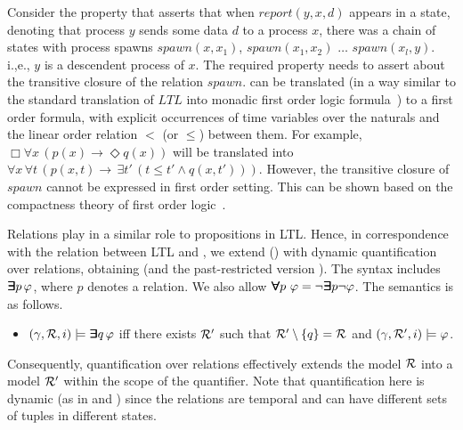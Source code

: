 \vspace{1ex}
Consider the property that asserts that when
$\mathit{report}(y , x, d)$ appears
in a state, denoting that  process 
$y$ sends some data $d$ to a process $x$,
there was a chain of states with process spawns
$\mathit{spawn}(x, x_1)$, $\mathit{spawn} (x_1, x_2)$ $\ldots$
$\mathit{spawn}(x_l , y)$. i.,e., $y$ is a descendent process of $x$.
The required property needs to
assert about the transitive closure
of the relation $\mathit{spawn}$. 
\FLTL{} can be translated (in a way similar to the standard translation of $LTL$ into monadic first order logic formula~\cite{Thomas}) to a first order formula, with explicit occurrences of time variables
over the naturals and the linear
order relation $<$ (or $\leq$) between them.
For example, $\Box \forall x \, (p(x) \rightarrow \Diamond q(x))$ will be translated into $\forall x \, \forall t \, (p(x, t) \rightarrow  \, \exists t' \, (t \leq t' \wedge q(x, t') ) )$.
However, the transitive closure of $\mathit{spawn}$ cannot be expressed in first order setting. This can be
shown based on the
compactness theory of first order logic~\cite{Flum}.

\vspace{1.5ex}
 Relations play in \FLTL{} a
similar role to propositions in LTL.
Hence, in correspondence with the relation
between LTL and \QLTL{}, we
extend \FLTL{} (\PFLTL{}) with dynamic quantification over relations, obtaining \QFLTL{}
(and the past-restricted version \QPFLTL{}). 
The syntax includes $\bm{\exists}\kern-0.6em\bm{\exists} p \, \varphi$, 
where $p$ denotes a relation.
We also allow $\Forall p\ \varphi = \neg \Exists p \neg  \varphi$. The semantics is as follows. %




\begin{itemize}
\item $(\gamma ,  {\cal R}, i) \models \bm{\exists}\kern-0.6em\bm{\exists} q \, \varphi$ iff there exists
${\cal R}'$ such that ${\cal R}' \setminus {\{ q \} } = {\cal R}$ and 
$( \gamma, {\cal R}' , i) \models \varphi$.
\end{itemize}
Consequently, quantification over relations effectively extends the model ${\cal R}$ into a model ${\cal R}'$ within the scope of the quantifier. Note that quantification here is dynamic (as in \QLTL{} and \QPLTL{}) since the relations are temporal and can have different sets of tuples in different states.

